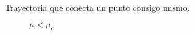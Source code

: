 \begin{ejemplo}
  \begin{tcolorbox}[colback=Black!4, colframe=White,arc=2mm]
  \begin{definicion}
    Trayectoria que conecta un punto consigo mismo.
  \end{definicion}
  \end{tcolorbox}
  \begin{figure}[H]
   \centering
    \subfloat[]{
      \texttt{[image: gb21]}} 
      \caption{$ \mu<\mu_c$}
      \label{bh6}
  \end{figure} 
  
\end{ejemplo}

